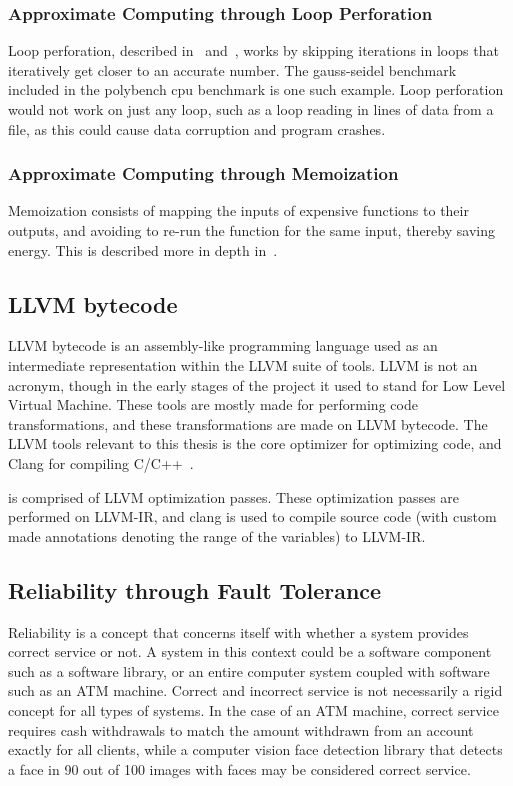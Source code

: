\subsubsection{Approximate Computing through Loop Perforation}

Loop perforation, described in~\citet{li2018sculptor} and~\citet{baek2010green}, works by skipping iterations in loops that iteratively get closer to an accurate number. The gauss-seidel benchmark included in the polybench cpu benchmark\citep{polybench} is one such example. Loop perforation would not work on just any loop, such as a loop reading in lines of data from a file, as this could cause data corruption and program crashes.

\subsubsection{Approximate Computing through Memoization}

Memoization consists of mapping the inputs of expensive functions to their outputs, and avoiding to re-run the function for the same input, thereby saving energy. This is described more in depth in~\citet{mittal2016survey}.

\subsection{LLVM bytecode}
LLVM bytecode is an assembly-like programming language used as an intermediate representation within the LLVM suite of tools. LLVM is not an acronym, though in the early stages of the project it used to stand for Low Level Virtual Machine. These tools are mostly made for performing code transformations, and these transformations are made on LLVM bytecode. The LLVM tools relevant to this thesis is the core optimizer for optimizing code, and Clang for compiling C/C++~\citep{LLVM_homepage}.  %

\taffo{} is comprised of LLVM optimization passes. These optimization passes are performed on LLVM-IR, and clang is used to compile source code (with custom made annotations denoting the range of the variables) to LLVM-IR. %



\subsection{Reliability through Fault Tolerance}\label{section:Reliability_thorugh_fault_tolerance}
Reliability is a concept that concerns itself with whether a system provides correct service or not. A system in this context could be a software component such as a software library, or an entire computer system coupled with software such as an ATM machine. Correct and incorrect service is not necessarily a rigid concept for all types of systems. In the case of an ATM machine, correct service requires cash withdrawals to match the amount withdrawn from an account exactly for all clients, while a computer vision face detection library that detects a face in 90 out of 100 images with faces may be considered correct service.


